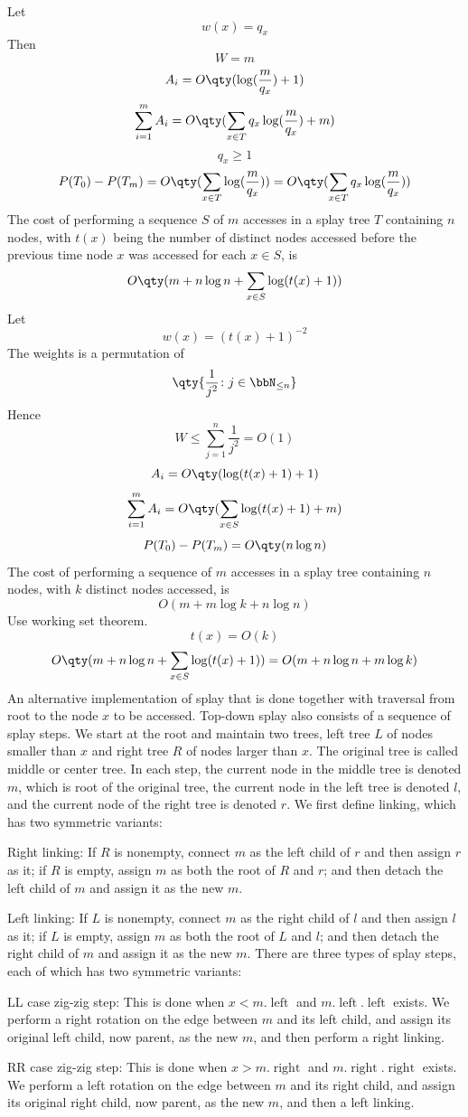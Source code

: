 \documentclass[a4paper,12pt]{article}
\begin{document}
\bpr
Let
\[w(x)=q_x\]
Then
\[W=m\]
\[A_i=O\qty(\log(\frac{m}{q_x})+1)\]
\[\sum_{i=1}^mA_i=O\qty(\sum_{x\in T}q_x\log(\frac{m}{q_x})+m)\]
\[q_x\ge 1\]
\[P(T_0)-P(T_m)=O\qty(\sum_{x\in T}\log(\frac{m}{q_x}))=O\qty(\sum_{x\in T}q_x\log(\frac{m}{q_x}))\]
\epr
{}
The cost of performing a sequence $S$ of $m$ accesses in a splay tree $T$ containing $n$ nodes, with $t(x)$ being the number of distinct nodes accessed before the previous time node $x$ was accessed for each $x\in S$, is
\[O\qty(m+n\log n+\sum_{x\in S}\log(t(x)+1))\]
\bpr
Let
\[w(x)=(t(x)+1)^{-2}\]
The weights is a permutation of
\[\qty{\frac{1}{j^2}\colon j\in\bbN_{\le n}}\]
Hence
\[W\le\sum_{j=1}^n\frac{1}{j^2}=O(1)\]
\[A_i=O\qty(\log(t(x)+1)+1)\]
\[\sum_{i=1}^mA_i=O\qty(\sum_{x\in S}\log(t(x)+1)+m)\]
\[P(T_0)-P(T_m)=O\qty(n\log n)\]
\epr
{}
The cost of performing a sequence of $m$ accesses in a splay tree containing $n$ nodes, with $k$ distinct nodes accessed, is
\[O(m+m\log k+n\log n)\]
\bpr
Use working set theorem.
\[t(x)=O(k)\]
\[O\qty(m+n\log n+\sum_{x\in S}\log(t(x)+1))=O(m+n\log n+m\log k)\]
\epr
{}
An alternative implementation of splay that is done together with traversal from root to the node $x$ to be accessed. Top-down splay also consists of a sequence of splay steps. We start at the root and maintain two trees, left tree $L$ of nodes smaller than $x$ and right tree $R$ of nodes larger than $x$. The original tree is called middle or center tree. In each step, the current node in the middle tree is denoted $m$, which is root of the original tree, the current node in the left tree is denoted $l$, and the current node of the right tree is denoted $r$. We first define linking, which has two symmetric variants:
\bit
\item Right linking: If $R$ is nonempty, connect $m$ as the left child of $r$ and then assign $r$ as it; if $R$ is empty, assign $m$ as both the root of $R$ and $r$; and then detach the left child of $m$ and assign it as the new $m$.
\item Left linking: If $L$ is nonempty, connect $m$ as the right child of $l$ and then assign $l$ as it; if $L$ is empty, assign $m$ as both the root of $L$ and $l$; and then detach the right child of $m$ and assign it as the new $m$.
\eit
There are three types of splay steps, each of which has two symmetric variants:
\bit
\item LL case zig-zig step: This is done when $x<m.\operatorname{left}$ and $m.\operatorname{left}.\operatorname{left}$ exists. We perform a right rotation on the edge between $m$ and its left child, and assign its original left child, now parent, as the new $m$, and then perform a right linking.
\item RR case zig-zig step: This is done when $x>m.\operatorname{right}$ and $m.\operatorname{right}.\operatorname{right}$ exists. We perform a left rotation on the edge between $m$ and its right child, and assign its original right child, now parent, as the new $m$, and then a left linking.
\end{document}
